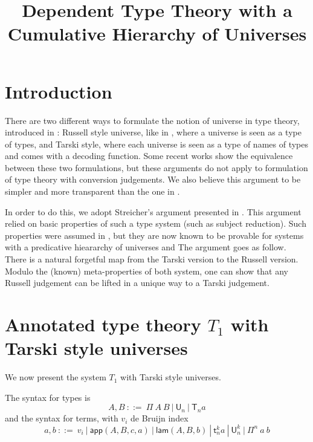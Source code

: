 \documentclass[11pt,a4paper]{article}
\theoremstyle{definition}
\def\UU{\mathsf{U}}
\newcommand{\LAM}{\mathsf{lam}}
\newcommand{\APP}{\mathsf{app}}
\newcommand{\T}{\mathsf{T}}
\newcommand{\sT}{\mathsf{t}}
\begin{document}
\title{Dependent Type Theory with a Cumulative Hierarchy of Universes}

\author{}
\date{}
\maketitle


\section{Introduction}\label{sec:intros}

There are two different ways to formulate the notion of universe in type theory, introduced in \cite{martinlof:padova}:
Russell style universe, like in \cite{martinlof:hannover}, where a universe is seen as a type of types,
and Tarski style, where each universe is seen as a type of names of types and comes with a decoding function.
Some recent works \cite{Assaf14,Thire20} show the equivalence between these two formulations, but these arguments
do not apply to formulation of type theory with conversion judgements. We also believe this argument to be simpler
and more transparent than the one in \cite{Assaf14,Thire20}.

In order to do this, we adopt Streicher's argument presented in \cite{Streicher:semtt}. This argument relied
on  basic properties of such a type system (such as subject reduction). Such properties were assumed
in \cite{Streicher:semtt}, but they are now known to be provable
for systems with a predicative hieararchy of universes \cite{coquand:sophia,abel:neworleans,abel:wroclaw,coq18} and
The argument goes as follow. There is a natural forgetful map from the Tarski version to the Russell version. Modulo the (known)
  meta-properties of both system, one can show that any Russell judgement can be lifted in a unique way to a Tarski judgement.

\section{Annotated type theory $T_1$ with Tarski style universes}

We now present the system $T_1$ with Tarski style universes. 

The syntax for types is
$$
A,B~::=~\Pi~{A}~B~|~\UU_n~|~\T_n a
$$
and the syntax for terms, with $v_i$ de Bruijn index
$$
a,b~::=~v_i~|~\APP(A,B,c,a)~|~\LAM(A,B,b)~|~\sT^k_n a~|~\UU^k_n~|~\Pi^n~a~b
$$
\end{document}
